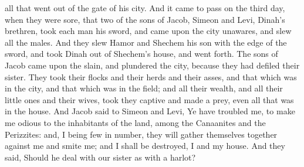 all that went out of the gate of his city. And it came to pass on the third day, when they were sore, that two of the sons of Jacob, Simeon and Levi, Dinah’s brethren, took each man his sword, and came upon the city unawares, and slew all the males. And they slew Hamor and Shechem his son with the edge of the sword, and took Dinah out of Shechem’s house, and went forth. The sons of Jacob came upon the slain, and plundered the city, because they had defiled their sister. They took their flocks and their herds and their asses, and that which was in the city, and that which was in the field; and all their wealth, and all their little ones and their wives, took they captive and made a prey, even all that was in the house. And Jacob said to Simeon and Levi, Ye have troubled me, to make me odious to the inhabitants of the land, among the Canaanites and the Perizzites: and, I being few in number, they will gather themselves together against me and smite me; and I shall be destroyed, I and my house. And they said, Should he deal with our sister as with a harlot? 

